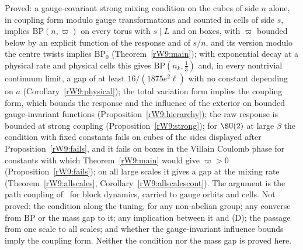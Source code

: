 \begin{remark}[status]\label{rW9:status}
Proved: a gauge-covariant strong mixing condition on the cubes of side $n$
alone, in coupling form modulo gauge transformations and counted in cells of
side $s$, implies $\mathrm{BP}(n,\varpi)$ on every torus with $s\mid L$ and on
boxes, with $\varpi$ bounded below by an explicit function of the response
and of $s/n$, and its version modulo the centre twists implies
$\mathrm{BP}_0$ (Theorem~\ref{rW9:main}); with exponential decay at a
physical rate and physical cells this gives $\mathrm{BP}(n_k,\frac13)$ and,
in every nontrivial continuum limit, a gap of at least $16/(1875e^2\ell)$
with no constant depending on $a$ (Corollary~\ref{rW9:physical}); the total
variation form implies the coupling form, which bounds the response and the
influence of the exterior on bounded gauge-invariant functions
(Proposition~\ref{rW9:hierarchy}); the raw response is bounded at strong
coupling (Proposition~\ref{rW9:strong}); for $\SU(2)$ at large $\beta$ the
condition with fixed constants fails on cubes of the sides displayed after
Proposition~\ref{rW9:fails}, and it fails on boxes in the Villain Coulomb
phase for constants with which Theorem~\ref{rW9:main} would give $\varpi>0$ (Proposition~\ref{rW9:fails}); on all large scales it gives a gap at
the mixing rate (Theorem~\ref{rW9:allscales},
Corollary~\ref{rW9:allscalescont}). The argument is the path coupling
of~\cite{BD97,DSVW04} for block dynamics, carried to gauge orbits and cells.
Not proved: the condition along the tuning, for any non-abelian group; any
converse from $\mathrm{BP}$ or the mass gap to it; any implication between
it and (D); the passage from one scale to all scales; and whether the
gauge-invariant influence bounds imply the coupling form. Neither the
condition nor the mass gap is proved here.
\end{remark}
